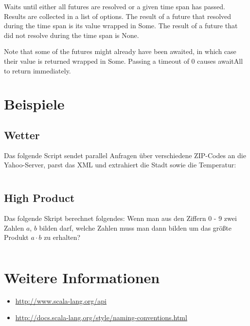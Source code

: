 Waits until either all futures are resolved or a given time span has passed. Results are collected in a list of options. The result of a future that resolved during the time span is its value wrapped in Some. The result of a future that did not resolve during the time span is None.

Note that some of the futures might already have been awaited, in which case their value is returned wrapped in Some. Passing a timeout of 0 causes awaitAll to return immediately.


\section{Beispiele}
\subsection{Wetter}
Das folgende Script sendet parallel Anfragen über verschiedene ZIP-Codes an
die Yahoo-Server, parst das XML und extrahiert die Stadt sowie die Temperatur:

\inputminted[linenos, numbersep=5pt, tabsize=4, frame=lines, label=weather.scala]{scala}{scripts/scala/weather.scala}

\subsection{High Product}
Das folgende Skript berechnet folgendes: Wenn man aus den Ziffern 0 - 9 zwei
Zahlen $a$, $b$ bilden darf, welche Zahlen muss man dann bilden um das größte Produkt
$a \cdot b$ zu erhalten?

\inputminted[linenos, numbersep=5pt, tabsize=4, frame=lines, label=main.scala]{scala}{scripts/scala/HighProduct.scala}

\section{Weitere Informationen}
\begin{itemize}
    \item \url{http://www.scala-lang.org/api}
    \item \url{http://docs.scala-lang.org/style/naming-conventions.html}
\end{itemize}

